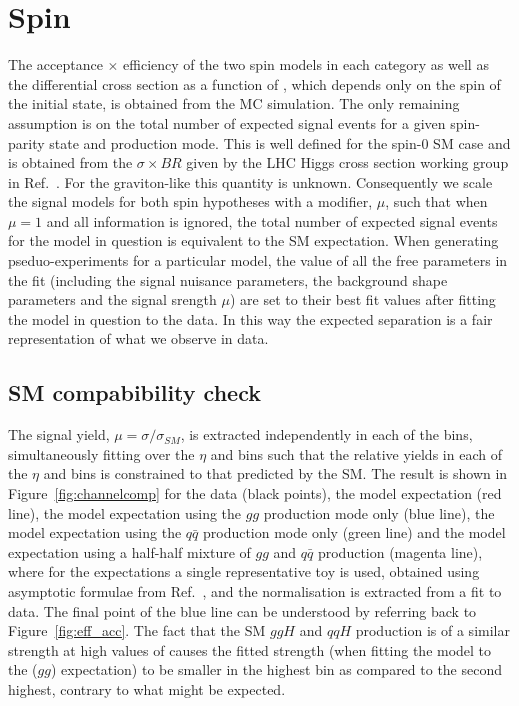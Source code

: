 \section{Spin}
\label{sec:spin_results}

The acceptance $\times$ efficiency of the two spin models in each category as well as the differential cross section as a function of \abscostheta, which depends only on the spin of the initial state, is obtained from the MC simulation. The only remaining assumption is on the total number of expected signal events for a given spin-parity state and production mode. This is well defined for the spin-0 SM case and is obtained from the $\sigma\times BR$ given by the LHC Higgs cross section working group in Ref.~\cite{LHCHiggsCrossSectionWorkingGroup3}. For the graviton-like \twomp this quantity is unknown. 
Consequently we scale the signal models for both spin hypotheses with a modifier, $\mu$, such that when $\mu=1$ and all \costhetastar information is ignored, the total number of expected signal events for the model in question is equivalent to the SM expectation. 
When generating pseduo-experiments for a particular model, the value of all the free parameters in the fit (including the signal nuisance parameters, the background shape parameters and the signal srength $\mu$) are set to their best fit values after fitting the model in question to the data.
In this way the expected separation is a fair representation of what we observe in data.

\subsection{SM compabibility check}
The signal yield, $\mu=\sigma/\sigma_{SM}$, is extracted independently in each of the \abscostheta bins, 
simultaneously fitting over the $\eta$ and \rnine bins such that the relative yields in each of the $\eta$ and \rnine 
bins is constrained to that predicted by the SM. The result is shown in Figure~\ref{fig:channelcomp} for the data (black points), the \zerop model expectation (red line), the \twomp model expectation using the $gg$ production mode only (blue line), the \twomp model expectation using the $q\bar{q}$ production mode only (green line) and the \twomp model expectation using a half-half mixture of $gg$ and $q\bar{q}$ production (magenta line), where for the expectations a single representative toy is used, obtained using asymptotic formulae from Ref.~\cite{asymptotic_form}, and the normalisation is extracted from a fit to data. The final point of the blue line can be understood
by referring back to Figure~\ref{fig:eff_acc}. The fact that the SM $ggH$ and $qqH$ production is of a similar strength at high values of \abscostheta causes the 
fitted strength (when fitting the \zerop model to the \twomp($gg$) expectation) to be smaller in the highest \abscostheta bin as compared to the second highest, contrary to what might be expected. 

